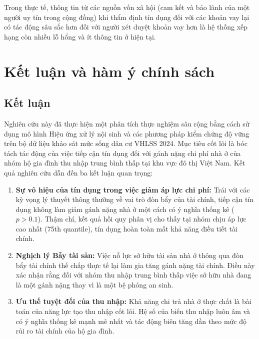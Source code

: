 \documentclass[12pt,a4paper]{report}
\begin{document}
Trong thực tế, thông tin từ các nguồn vốn xã hội (cam kết và bảo lãnh của một người uy tín trong cộng đồng) khi thẩm định tín dụng đối với các khoản vay lại có tác động sâu sắc hơn đối với người xét duyệt khoản vay hơn là hệ thống xếp hạng còn nhiều lỗ hổng và ít thông tin ở hiện tại. 

\chapter{Kết luận và hàm ý chính sách}

\section{Kết luận}

Nghiên cứu này đã thực hiện một phân tích thực nghiệm sâu rộng bằng cách sử dụng mô hình Hiệu ứng xử lý nội sinh và các phương pháp kiểm chứng độ vững trên bộ dữ liệu khảo sát mức sống dân cư VHLSS 2024. Mục tiêu cốt lõi là bóc tách tác động của việc tiếp cận tín dụng đối với gánh nặng chi phí nhà ở của nhóm hộ gia đình thu nhập trung bình thấp tại khu vực đô thị Việt Nam. Kết quả nghiên cứu dẫn đến ba kết luận quan trọng:

\begin{enumerate}
	
	\item \textbf{Sự vô hiệu của tín dụng trong việc giảm áp lực chi phí:} Trái với các kỳ vọng lý thuyết thông thường về vai trò đòn bẩy của tài chính, tiếp cận tín dụng không làm giảm gánh nặng nhà ở một cách có ý nghĩa thống kê ($p > 0.1$). Thậm chí, kết quả hồi quy phân vị cho thấy tại nhóm chịu áp lực cao nhất (75th quantile), tín dụng hoàn toàn mất khả năng điều tiết tài chính.
	
	\item \textbf{Nghịch lý Bẫy tài sản:} Việc nỗ lực sở hữu tài sản nhà ở thông qua đòn bẩy tài chính thế chấp thực tế lại làm gia tăng gánh nặng tài chính. Điều này xác nhận rằng đối với nhóm thu nhập trung bình thấp việc sở hữu nhà đang là một gánh nặng thay vì là một bệ phóng an sinh.
	
	\item \textbf{Ưu thế tuyệt đối của thu nhập:} Khả năng chi trả nhà ở thực chất là bài toán của năng lực tạo thu nhập cốt lõi. Hệ số của biến thu nhập luôn âm và có ý nghĩa thống kê mạnh mẽ nhất và tác động biên tăng dần theo mức độ rủi ro tài chính của hộ gia đình.
\end{enumerate}
\end{document}
